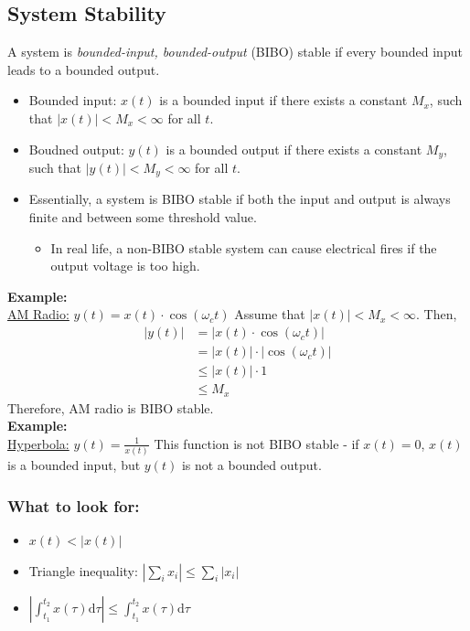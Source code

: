 \documentclass[10pt]{article}
\newcommand{\example}{\textbf{Example: }}
\begin{document}
\subsection*{System Stability}
A system is \textit{bounded-input, bounded-output} (BIBO) stable if every bounded input leads to a bounded output.
\begin{itemize}
    \item Bounded input: $x(t)$ is a bounded input if there exists a constant $M_x$, such that $|x(t)| < M_x < \infty$ for all $t$.
    \item Boudned output: $y(t)$ is a bounded output if there exists a constant $M_y$, such that $|y(t)| < M_y < \infty$ for all $t$.
    \item Essentially, a system is BIBO stable if both the input and output is always finite and between some threshold value.
    \begin{itemize}
        \item In real life, a non-BIBO stable system can cause electrical fires if the output voltage is too high.
    \end{itemize}
\end{itemize}
\example\\
\underline{AM Radio:} $y(t) = x(t) \cdot \cos(\omega_c t)$
Assume that $|x(t)| < M_x < \infty$.
Then, 
\begin{align*}
    |y(t)| &= |x(t) \cdot \cos(\omega_c t)| \\
    &= |x(t)| \cdot |\cos(\omega_c t)| \\
    &\leq |x(t)| \cdot 1\\
    &\leq M_x
\end{align*}
Therefore, AM radio is BIBO stable.\\
\example\\
\underline{Hyperbola:} $y(t) = \frac{1}{x(t)}$
This function is not BIBO stable - if $x(t) = 0$, $x(t)$ is a bounded input, but $y(t)$ is not a bounded output.
\subsubsection*{What to look for:}
\begin{itemize}
    \item $x(t) < |x(t)|$
    \item Triangle inequality: $\left|\sum_i x_i \right| \leq \sum_i \vert x_i \vert$
    \item $\left| \int_{t_1}^{t_2} x(\tau) \text{d}\tau \right| \leq \int_{t_1}^{t_2} x(\tau) \text{d}\tau$
\end{itemize}
\end{document}
